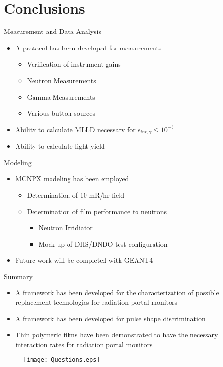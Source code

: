 \documentclass[compress]{beamer}
\begin{document}
\section*{Conclusions}
\begin{frame}{Measurement and Data Analysis}
	\begin{itemize}
		\item A protocol has been developed for measurements
		\begin{itemize}
			\item Verification of instrument gains
			\item Neutron Measurements
			\item Gamma Measurements
			\item Various button sources
		\end{itemize}
		\item Ability to calculate MLLD necessary for $\epsilon_{int,\gamma} \le 10^{-6}$
		\item Ability to calculate light yield
	\end{itemize}
\end{frame}
\begin{frame}{Modeling}
	\begin{itemize}
		\item MCNPX modeling has been employed
		\begin{itemize}
			\item Determination of 10 mR/hr field
			\item Determination of film performance to neutrons
			\begin{itemize}
				\item Neutron Irridiator
				\item Mock up of DHS/DNDO test configuration
			\end{itemize}
		\end{itemize}
		\item Future work will be completed with GEANT4
	\end{itemize}
\end{frame}
\begin{frame}{Summary}

  \begin{itemize}
  \item
    A framework has been developed for the characterization of possible replacement technologies for radiation portal monitors
  \item
    A framework has been developed for pulse shape discrimination 
  \item
    Thin polymeric films have been demonstrated to have the necessary interaction rates for radiation portal monitors
  \end{itemize}
\begin{figure}
	\centering
		\texttt{[image: Questions.eps]}
\end{figure}
\end{frame}
\end{document}
